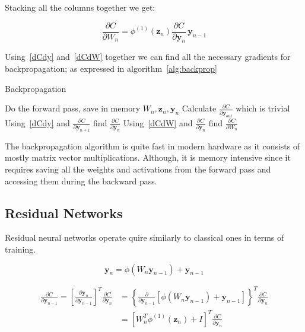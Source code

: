 \documentclass[11pt]{article}
\begin{document}
    Stacking all the columns together we get:

    \begin{equation}
        \label{dCdW}
        \frac{ \partial C}{\partial W_n}
        =
        \phi^{(1)}(\pmb{z}_n )
        \frac{ \partial C}{\partial \pmb{y}_{n} }  \,
        \pmb{y}_{n-1}
    \end{equation}

    Using~\eqref{dCdy} and~\eqref{dCdW} together we can find all the necessary gradients for backpropagation; as expressed in algorithm~\ref{alg:backprop}

    \begin{algorithm}
        \caption{Backpropagation}
        \label{alg:backprop}
        \begin{algorithmic}
            \State Do the forward pass, save in memory $W_n, \textbf{z}_n, \textbf{y}_n$
            \State Calculate $\frac{\partial C}{\partial \textbf{y}_{out}}$ which is trivial
                \State Using~\eqref{dCdy} and  $\frac{\partial C}{\partial \textbf{y}_{n+1}} $ find $\frac{\partial C}{\partial \textbf{y}_n}$
                \State  Using~\eqref{dCdW} and $\frac{\partial C}{\partial \textbf{y}_n}$ find $\frac{\partial C}{\partial W_n}$
            \EndFor
        \end{algorithmic}
    \end{algorithm}

    The backpropagation algorithm is quite fast in modern hardware as it consists of mostly matrix vector multiplications.
    Although, it is memory intensive since it requires saving all the weights and activations from the forward pass and accessing them during the backward pass.

    \subsection{Residual Networks}
    Residual neural networks operate quire similarly to classical ones in terms of training.

    \begin{equation}
        \bm{y}_{n} = \phi( W_{n} \bm{y}_{n-1} ) + \bm{y}_{n-1}
    \end{equation}

    \begin{align}
        \label{resnet_dCdy}
        \frac{ \partial C}{\partial \textbf{y}_{n-1} }
        =
        \left[ \frac{ \partial \textbf{y}_{n}}{\partial \textbf{y}_{n-1}  } \right]^T
        \frac{ \partial C}{\partial \textbf{y}_{n} }
        &=
        \left\{
        \frac{ \partial }{\partial \textbf{y}_{n-1}}
        \left[
            \phi( W_n \textbf{y}_{n-1} ) + \textbf{y}_{n-1}
            \right]
        \right\}^T
        \frac{ \partial C}{ \partial \textbf{y}_{n} }
        \\
        &=
        \left[
            W_n^T \phi^{(1)}( \pmb{z}_n ) + I
            \right]^T
        \frac{ \partial C}{\partial \textbf{y}_{n} }
    \end{align}
\end{document}
